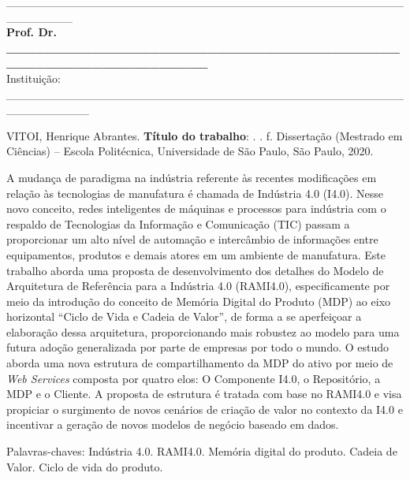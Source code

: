 \begin{folhadeaprovacao}
\begin{center}
		\vspace*{2cm}

		\_\_\_\_\_\_\_\_\_\_\_\_\_\_\_\_\_\_\_\_\_\_\_\_\_\_\_\_\_\_\_\_\_\_\_\_\_\_\_\_\_\_\_\_\_\_\_\_\_\_\_\_\_\_\_\_
		\vspace*{0.2cm} 
		\\ \textbf{Prof. Dr. \_\_\_\_\_\_\_\_\_\_\_\_\_\_\_\_\_\_\_\_\_\_\_\_\_\_\_\_\_\_\_\_\_\_\_\_\_\_\_\_\_\_\_\_\_\_\_\_\_\_\_\_\_\_\_\_\_\_\_\_\_\_} 
		\\ \vspace*{0.2cm} 
		Instituição: \_\_\_\_\_\_\_\_\_\_\_\_\_\_\_\_\_\_\_\_\_\_\_\_\_\_\_\_\_\_\_\_\_\_\_\_\_\_\_\_\_\_\_\_\_\_\_\_\_\_\_\_\_\_\_\_\_\_
	\end{center}
  
\end{folhadeaprovacao}

\setlength{\absparsep}{18pt}	%
\begin{resumo}

	\begin{flushleft}
		VITOI, Henrique Abrantes. \textbf{Título do trabalho}: \imprimirtitulo. \imprimirdata. \pageref{LastPage} f. Dissertação (Mestrado em Ciências) – Escola Politécnica, Universidade de São Paulo, São Paulo, 2020.
	\end{flushleft}

	A mudança de paradigma na indústria referente às recentes modificações em relação às tecnologias de manufatura é chamada de Indústria 4.0 (I4.0). Nesse novo conceito, redes inteligentes de máquinas e processos para indústria com o respaldo de Tecnologias da Informação e Comunicação (TIC) passam a proporcionar um alto nível de automação e intercâmbio de informações entre equipamentos, produtos e demais atores em um ambiente de manufatura.
	Este trabalho aborda uma proposta de desenvolvimento dos detalhes do Modelo de Arquitetura de Referência para a Indústria 4.0 (RAMI4.0), especificamente por meio da introdução do conceito de Memória Digital do Produto (MDP) ao eixo horizontal ``Ciclo de Vida e Cadeia de Valor'', de forma a se aperfeiçoar a elaboração dessa arquitetura, proporcionando mais robustez ao modelo para uma futura adoção generalizada por parte de empresas por todo o mundo.
	O estudo aborda uma nova estrutura de compartilhamento da MDP do ativo por meio de \textit{Web Services} composta por quatro elos: O Componente I4.0, o Repositório, a MDP e o Cliente. A proposta de estrutura é tratada com base no RAMI4.0 e visa propiciar o surgimento de novos cenários de criação de valor no contexto da I4.0 e incentivar a geração de novos modelos de negócio baseado em dados.

	Palavras-chaves: Indústria 4.0. RAMI4.0. Memória digital do produto. Cadeia de Valor. Ciclo de vida do produto.
	
\end{resumo}

